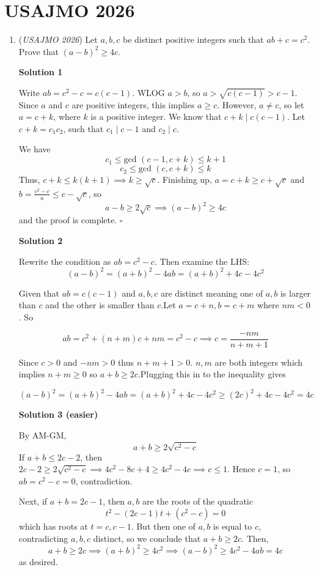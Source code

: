 \section{USAJMO 2026}
        \begin{enumerate}
        	\item (\textit{USAJMO 2026}) Let $a,b,c$ be distinct positive integers such that $ab+c=c^2$. Prove that $(a-b)^2\ge 4c$.


 



\textbf{Solution 1}

Write $ab=c^2-c=c(c-1)$. WLOG $a>b$, so $a>\sqrt{c(c-1)}>c-1$. Since $a$ and $c$ are positive integers, this implies $a\geq c$. However, $a\neq c$, so let $a = c+k$, where $k$ is a positive integer. We know that $c+k \mid c(c-1)$. Let $c+k = c_1 c_2$, such that $c_1 \mid c - 1$ and $c_2\mid c$. 

 We have 
 \[c_1 \leq \text{gcd }(c-1, c+k)\leq k+1\] 
 \[c_2 \leq \text{gcd }(c, c+k)\leq k\] Thus, $c+k\leq k(k+1)\implies k\geq \sqrt{c}$. Finishing up, $a=c+k\geq c+\sqrt{c}$ and $b=\frac{c^2-c}{a}\leq c-\sqrt{c}$, so 
 \[a-b\geq 2\sqrt{c}\implies (a-b)^2\geq 4c\] and the proof is complete. $\square$




\textbf{Solution 2}

Rewrite the condition as $ab=c^2-c$. Then examine the LHS:
 \[(a-b)^2=(a+b)^2-4ab=(a+b)^2+4c-4c^2\]

 Given that $ab=c(c-1)$ and $a,b,c$ are distinct meaning one of $a,b$ is larger than $c$ and the other is smaller than $c$.Let $a=c+n,b=c+m$ where $nm<0$. So

 
 \[ab=c^2+(n+m)c+nm=c^2-c\implies c=\frac{-nm}{n+m+1}\]

 Since $c>0$ and $-nm>0$ thus $n+m+1>0$. $n,m$ are both integers which implies $n+m\ge 0$ so $a+b\ge 2c$.Plugging this in to the inequality gives

 
 \[(a-b)^2=(a+b)^2-4ab=(a+b)^2+4c-4c^2\ge (2c)^2+4c-4c^2=4c\]




\textbf{Solution 3 (easier)}

By AM-GM,
 \[a+b\ge 2\sqrt{c^2-c}\]If $a+b\le 2c-2$, then $2c-2\ge 2\sqrt{c^2-c}\implies 4c^2-8c+4\ge 4c^2-4c\implies c\le 1$. Hence $c=1$, so $ab=c^2-c=0$, contradiction.

 Next, if $a+b=2c-1$, then $a,b$ are the roots of the quadratic
 \[t^2-(2c-1)t+(c^2-c)=0\]which has roots at $t=c,c-1$. But then one of $a,b$ is equal to $c$, contradicting $a,b,c$ distinct, so we conclude that $a+b\ge 2c$. Then,
 \[a+b\ge 2c\implies (a+b)^2\ge 4c^2\implies (a-b)^2\ge 4c^2-4ab=4c\]as desired.


\end{enumerate}

